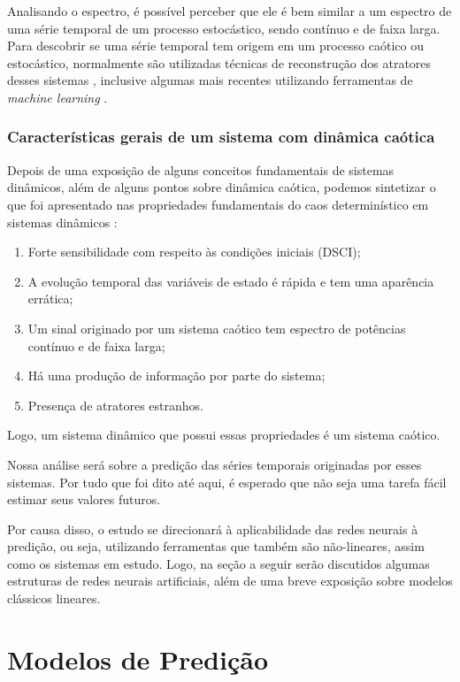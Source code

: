 \documentclass[a4paper, 12pt]{article}
\begin{document}
Analisando o espectro, é possível perceber que ele é bem similar a um espectro de uma série temporal de um processo estocástico, sendo contínuo e de faixa larga. Para  descobrir se uma série temporal tem origem em um processo caótico ou estocástico, normalmente são utilizadas técnicas de reconstrução dos atratores desses sistemas \cite{packard1980geometry}, inclusive algumas mais recentes utilizando ferramentas de \textit{machine learning} \cite{lu2018attractor}.

\subsubsection{Características gerais de um sistema com dinâmica caótica}
Depois de uma exposição de alguns conceitos fundamentais de sistemas dinâmicos, além de alguns pontos sobre dinâmica caótica, podemos sintetizar o que foi apresentado nas propriedades fundamentais do caos determinístico em sistemas dinâmicos \cite{attux2001dinamica}:
\begin{enumerate}
\item Forte sensibilidade com respeito às condições iniciais (DSCI);
\item A evolução temporal das variáveis de estado é rápida e tem uma aparência errática;
\item Um sinal originado por um sistema caótico tem espectro de potências contínuo e de faixa larga;
\item Há uma produção de informação por parte do sistema;
\item Presença de atratores estranhos.
\end{enumerate}

Logo, um sistema dinâmico que possui essas propriedades é um sistema caótico.

Nossa análise será sobre a predição das séries temporais originadas por esses sistemas. Por tudo que foi dito até aqui, é esperado que não seja uma tarefa fácil estimar seus valores futuros.

Por causa disso, o estudo se direcionará à aplicabilidade das redes neurais à predição, ou seja, utilizando ferramentas que também são não-lineares, assim como os sistemas em estudo. Logo, na seção a seguir serão discutidos algumas estruturas de redes neurais artificiais, além de uma breve exposição sobre modelos clássicos lineares.

\section{Modelos de Predição}
\end{document}
